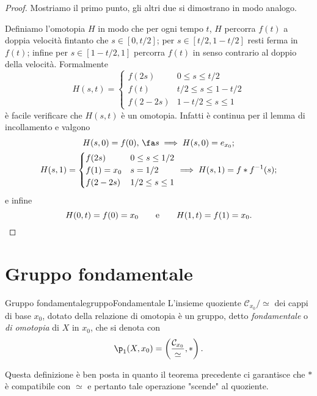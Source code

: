 \begin{proof}
	Mostriamo il primo punto, gli altri due si dimostrano in modo analogo.

	Definiamo l'omotopia \(H\) in modo che per ogni tempo \(t\), \(H\) percorra \(f(t)\) a doppia velocità fintanto che \(s\in[0,t/2]\);
	per \(s\in[t/2,1-t/2]\) resti ferma in \(f(t)\); infine per \(s\in[1-t/2,1]\) percorra \(f(t)\) in senso contrario al doppio della velocità.
	Formalmente
	\[
		H(s,t) = 	\begin{cases}
			f(2s)   & 0\le s \le t/2      \\
			f(t)    & t/2 \le s \le 1-t/2 \\
			f(2-2s) & 1-t/2 \le s \le 1
		\end{cases}
	\]
	è facile verificare che \(H(s,t)\) è un omotopia.
	Infatti è continua per il lemma di incollamento e valgono
	\begin{gather*}
		H(s,0) = f(0),\,\fa s \implies H(s,0) = e_{x_0};\\
		H(s,1) = 	\begin{cases}
			f(2s)      & 0\le s \le 1/2  \\
			f(1) = x_0 & s=1/2           \\
			f(2-2s)    & 1/2 \le s \le 1
		\end{cases}
		\implies H(s,1) = f*f^{-1}(s);
	\end{gather*}
	e infine
	\[
		H(0,t) = f(0) = x_0 \qquad\text{e}\qquad H(1,t) = f(1) = x_0.\qedhere
	\]
\end{proof}
\section{Gruppo fondamentale}

\begin{defn}{Gruppo fondamentale}{gruppoFondamentale}
	L'insieme quoziente \(\mathcal{C}_{x_0}/\simeq\) dei cappi di base \(x_0\), dotato della relazione di omotopia è un gruppo, detto \emph{fondamentale} o \emph{di omotopia} di \(X\) in \(x_0\), che si denota con
	\[
		\p_1(X,x_0) = \left( \frac{\mathcal{C}_{x_0}}{\simeq},* \right).
	\]
\end{defn}

\begin{oss}
	Questa definizione è ben posta in quanto il teorema precedente ci garantisce che \(*\) è compatibile con \(\simeq\) e pertanto tale operazione "scende" al quoziente.
\end{oss}

